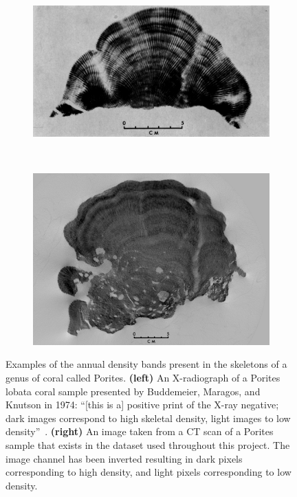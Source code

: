 \begin{figure}[t]
    \centering
    \begin{subfigure}[t]{0.49\textwidth}
        \centering
        \includegraphics[width=1\textwidth, valign=c]{images/knutson.jpg}
    \end{subfigure}
    ~
    \begin{subfigure}[t]{0.49\textwidth}
        \centering
        \includegraphics[width=1\textwidth, valign=c]{images/our-coral.png}
    \end{subfigure}
    \caption{Examples of the annual density bands present in the skeletons of a genus of coral called Porites. \textbf{(left)} An X-radiograph of a Porites lobata coral sample presented by Buddemeier, Maragos, and Knutson in 1974: ``[this is a] positive print of the X-ray negative; dark images correspond to high skeletal density, light images to low density''~\cite{coralimage}. \textbf{(right)} An image taken from a CT scan of a Porites sample that exists in the dataset used throughout this project. The image channel has been inverted resulting in dark pixels corresponding to high density, and light pixels corresponding to low density.}
    \label{fig:densityexample}
\end{figure}

